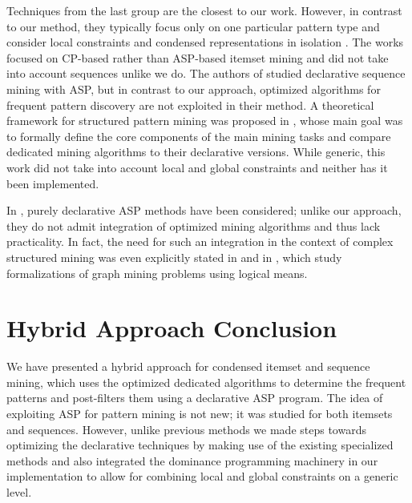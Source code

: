 {Techniques from the last group are the closest to our work. However, in contrast to our method, they typically focus only on one particular pattern type and consider local constraints and condensed representations in isolation \parencite{DBLP:conf/dmkd/PeiHM00,clospan}. %
The works \parencite{dp2013,DBLP:journals/ai/GunsDNTR17} focused on CP-based rather than ASP-based itemset mining and did not take into account sequences unlike we do. The authors of \parencite{DBLP:conf/ijcai/GebserGQ0S16} studied declarative sequence mining with ASP, but in contrast to our approach, optimized algorithms for frequent pattern discovery are not exploited in their method.
A theoretical framework for structured pattern mining was proposed in \parencite{DBLP:conf/aaai/GunsPN16}, whose main goal was to formally define the core components of the main mining tasks and compare dedicated mining algorithms to their declarative versions. While generic, this work did not take into account local and global constraints and neither has it been implemented.

In \parencite{DBLP:conf/lpnmr/Jarvisalo11,DBLP:conf/ijcai/GebserGQ0S16}, purely declarative ASP methods have been considered; unlike our approach, they do not admit integration of optimized mining algorithms and thus %
lack 
practicality. In fact, the need for such an integration in the context of complex structured mining was even explicitly stated
in \parencite{query_mining_ilp} and in \parencite{KR_Graphs}, which study formalizations of graph mining problems using logical means. 

\section{Hybrid Approach Conclusion}

We have presented a hybrid approach for condensed itemset and sequence mining, which uses the optimized dedicated algorithms to determine the frequent patterns and post-filters them using a declarative ASP program. The idea of exploiting ASP for pattern mining is not new; it was studied for both itemsets and sequences. However, unlike previous methods we made steps towards optimizing the declarative techniques by making use of the existing specialized methods and also integrated the dominance programming machinery in our implementation to allow for combining local and global constraints on a generic level.


}
